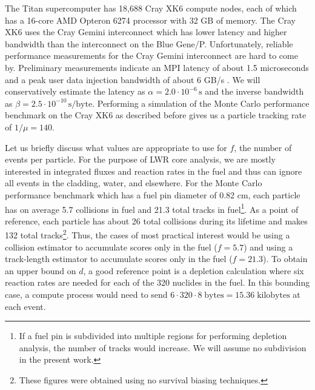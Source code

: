 \documentclass[3p]{elsarticle}
\newcommand{\unit}[1]{\ensuremath{\, \mathrm{#1}}}
\begin{document}
The Titan supercomputer has 18,688 Cray XK6 compute nodes, each of which has a
16-core AMD Opteron 6274 processor with 32 GB of memory. The Cray XK6 uses the
Cray Gemini interconnect which has lower latency and higher bandwidth than the
interconnect on the Blue Gene/P. Unfortunately, reliable performance
measurements for the Cray Gemini interconnect are hard to come by. Preliminary
measurements indicate an MPI latency of about 1.5 microseconds and a peak user
data injection bandwidth of about 6 GB/s \cite{hlrs-workshop-2011}. We will
conservatively estimate the latency as $\alpha = 2.0 \cdot 10^{-6} \unit{s}$ and
the inverse bandwidth as $\beta = 2.5 \cdot 10^{-10} \unit{s/byte}$. Performing
a simulation of the Monte Carlo performance benchmark on the Cray XK6 as
described before gives us a particle tracking rate of $1/\mu = 140$.

Let us briefly discuss what values are appropriate to use for $f$, the number of
events per particle. For the purpose of LWR core analysis, we are mostly
interested in integrated fluxes and reaction rates in the fuel and thus can
ignore all events in the cladding, water, and elsewhere. For the Monte Carlo
performance benchmark which has a fuel pin diameter of 0.82 cm, each particle
has on average 5.7 collisions in fuel and 21.3 total tracks in fuel\footnote{If
  a fuel pin is subdivided into multiple regions for performing depletion
  analysis, the number of tracks would increase. We will assume no subdivision
  in the present work.}. As a point of reference, each particle has about 26
total collisions during its lifetime and makes 132 total tracks\footnote{These
  figures were obtained using no survival biasing techniques.}. Thus, the cases
of most practical interest would be using a collision estimator to accumulate
scores only in the fuel ($f = 5.7$) and using a track-length estimator to
accumulate scores only in the fuel ($f = 21.3$). To obtain an upper bound on
$d$, a good reference point is a depletion calculation where six reaction rates
are needed for each of the 320 nuclides in the fuel. In this bounding case, a
compute process would need to send $6 \cdot 320 \cdot 8 \; \text{bytes} = 15.36
\; \text{kilobytes}$ at each event.
\end{document}
